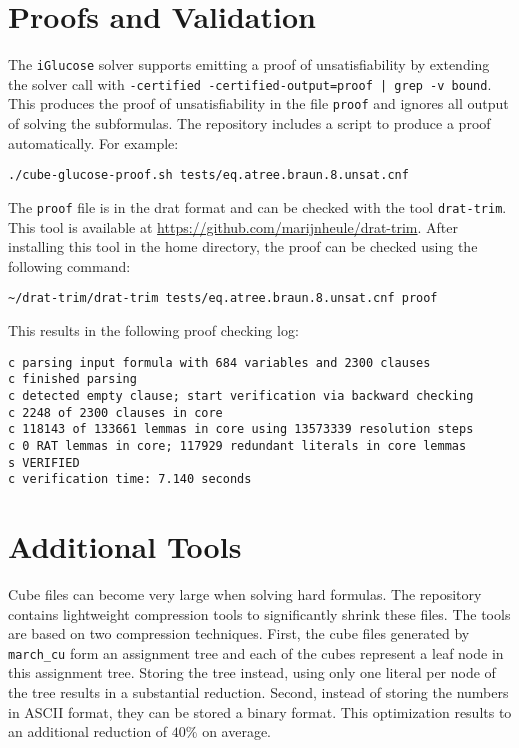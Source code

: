 \documentclass{llncs}
\begin{document}
\section{Proofs and Validation}

The {\tt iGlucose} solver supports emitting a proof of unsatisfiability by extending the
solver call with {\tt -certified -certified-output=proof | grep -v bound}. This produces the 
proof of unsatisfiability in the file {\tt proof} and ignores all output of solving the subformulas. 
The repository includes a script to produce a proof automatically. For example:

\begin{verbatim}
./cube-glucose-proof.sh tests/eq.atree.braun.8.unsat.cnf 
\end{verbatim}

The {\tt proof} file is in the {\sc drat} format and can be checked with the tool {\tt drat-trim}. 
This tool is available at \url{https://github.com/marijnheule/drat-trim}. After installing this
tool in the home directory, the proof can be checked using the following command:

\begin{verbatim}
~/drat-trim/drat-trim tests/eq.atree.braun.8.unsat.cnf proof
\end{verbatim}

This results in the following proof checking log:

\begin{verbatim}
c parsing input formula with 684 variables and 2300 clauses
c finished parsing
c detected empty clause; start verification via backward checking
c 2248 of 2300 clauses in core                            
c 118143 of 133661 lemmas in core using 13573339 resolution steps
c 0 RAT lemmas in core; 117929 redundant literals in core lemmas
s VERIFIED
c verification time: 7.140 seconds
\end{verbatim}

\section{Additional Tools}

Cube files can become very large when solving hard formulas. The repository contains lightweight compression tools to
significantly shrink these files. The tools are based on two compression techniques. First, the cube files generated by 
{\tt march\_cu} form an assignment tree and each of the cubes represent a leaf node in this assignment tree. Storing the 
tree instead, using only one literal per node of the tree results in a substantial reduction. Second, instead of storing
the numbers in ASCII format, they can be stored a binary format. This optimization results to an additional
reduction of $40\%$ on average.
\end{document}
